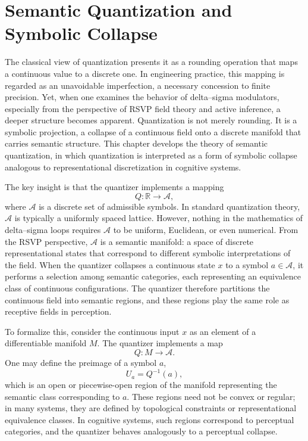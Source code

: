 
\chapter{Semantic Quantization and Symbolic Collapse}

The classical view of quantization presents it as a rounding operation that maps a continuous value to a discrete one. In engineering practice, this mapping is regarded as an unavoidable imperfection, a necessary concession to finite precision. Yet, when one examines the behavior of delta–sigma modulators, especially from the perspective of RSVP field theory and active inference, a deeper structure becomes apparent. Quantization is not merely rounding. It is a symbolic projection, a collapse of a continuous field onto a discrete manifold that carries semantic structure. This chapter develops the theory of semantic quantization, in which quantization is interpreted as a form of symbolic collapse analogous to representational discretization in cognitive systems.

The key insight is that the quantizer implements a mapping
\[
Q : \mathbb{R} \to \mathcal{A},
\]
where \(\mathcal{A}\) is a discrete set of admissible symbols. In standard quantization theory, \(\mathcal{A}\) is typically a uniformly spaced lattice. However, nothing in the mathematics of delta–sigma loops requires \(\mathcal{A}\) to be uniform, Euclidean, or even numerical. From the RSVP perspective, \(\mathcal{A}\) is a semantic manifold: a space of discrete representational states that correspond to different symbolic interpretations of the field. When the quantizer collapses a continuous state \(x\) to a symbol \(a \in \mathcal{A}\), it performs a selection among semantic categories, each representing an equivalence class of continuous configurations. The quantizer therefore partitions the continuous field into semantic regions, and these regions play the same role as receptive fields in perception.

To formalize this, consider the continuous input \(x\) as an element of a differentiable manifold \(M\). The quantizer implements a map
\[
Q : M \to \mathcal{A}.
\]
One may define the preimage of a symbol \(a\),
\[
U_{a} = Q^{-1}(a),
\]
which is an open or piecewise-open region of the manifold representing the semantic class corresponding to \(a\). These regions need not be convex or regular; in many systems, they are defined by topological constraints or representational equivalence classes. In cognitive systems, such regions correspond to perceptual categories, and the quantizer behaves analogously to a perceptual collapse.

